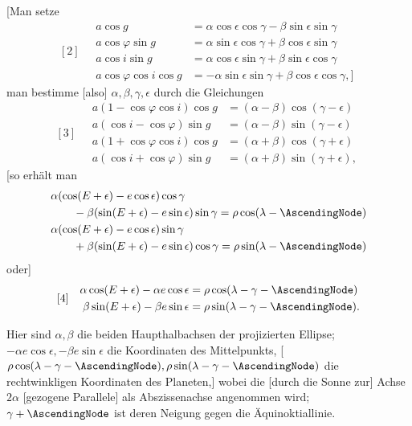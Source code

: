 [Man setze
\[
[2]\quad\begin{aligned}
a\cos g&=\alpha\cos\epsilon\cos\gamma-\beta\sin\epsilon\sin\gamma\\
a\cos\varphi\sin g&=\alpha\sin\epsilon\cos\gamma+\beta\cos\epsilon\sin\gamma\\
a\cos i\sin g&=\alpha\cos\epsilon\sin\gamma+\beta\sin\epsilon\cos\gamma\\
a\cos\varphi\cos i\cos g&=-\alpha\sin\epsilon\sin\gamma+\beta\cos\epsilon\cos\gamma,]
\end{aligned}
\]
man bestimme [also] \(\alpha,\beta,\gamma,\epsilon\) durch die Gleichungen
\[
[3]\quad\begin{aligned}
a(1-\cos\varphi\cos i)\cos g&=(\alpha-\beta)\cos(\gamma-\epsilon)\\
a(\cos i-\cos\varphi)\sin g&=(\alpha-\beta)\sin(\gamma-\epsilon)\\
a(1+\cos\varphi\cos i)\cos g&=(\alpha+\beta)\cos(\gamma+\epsilon)\\
a(\cos i+\cos\varphi)\sin g&=(\alpha+\beta)\sin(\gamma+\epsilon),
\end{aligned}
\]
[so erhält man
\[
\begin{aligned}
&\alpha(\cos(E+\epsilon)-e\cos\epsilon)\cos\gamma\\
&\qquad-\beta(\sin(E+\epsilon)-e\sin\epsilon)\sin\gamma
=\rho\cos(\lambda-\AscendingNode)\\
&\alpha(\cos(E+\epsilon)-e\cos\epsilon)\sin\gamma\\
&\qquad+\beta(\sin(E+\epsilon)-e\sin\epsilon)\cos\gamma
=\rho\sin(\lambda-\AscendingNode)
\end{aligned}
\]
oder]
\[
[4]\quad\begin{aligned}
\alpha\cos(E+\epsilon)-\alpha e\cos\epsilon&=\rho\cos(\lambda-\gamma-\AscendingNode)\\
\beta\sin(E+\epsilon)-\beta e\sin\epsilon&=\rho\sin(\lambda-\gamma-\AscendingNode).
\end{aligned}
\]

Hier sind \(\alpha,\beta\) die beiden Haupthalbachsen der projizierten Ellipse;
\(-\alpha e\cos\epsilon,\allowbreak -\beta e\sin\epsilon\) die Koordinaten des Mittelpunkts,
[\(\rho\cos(\lambda-\gamma-\AscendingNode),\allowbreak\rho\sin(\lambda-\gamma-\AscendingNode)\) die rechtwinkligen Koordinaten des Planeten,] wobei die [durch die Sonne zur] Achse \(2\alpha\) [gezogene Parallele] als Abszissenachse angenommen wird; \(\gamma+\AscendingNode\) ist deren Neigung gegen die Äquinoktiallinie.

